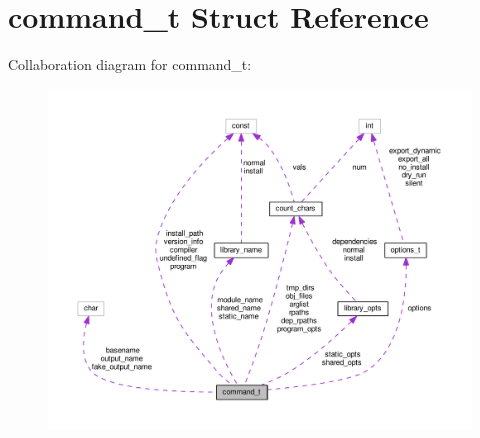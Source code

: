 \hypertarget{structcommand__t}{}\section{command\+\_\+t Struct Reference}
\label{structcommand__t}


Collaboration diagram for command\+\_\+t\+:
\nopagebreak
\begin{figure}[H]
\begin{center}
\leavevmode
\includegraphics[width=350pt]{structcommand__t__coll__graph}
\end{center}
\end{figure}
